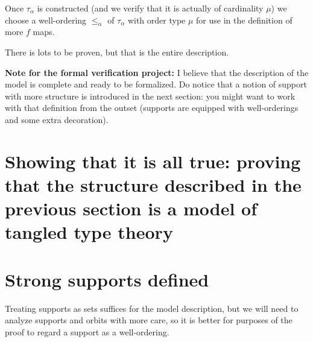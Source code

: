 Once $\tau_\alpha$ is constructed (and we verify that it is actually of cardinality $\mu$) we choose a well-ordering $\leq_\alpha$ of $\tau_\alpha$ with order type $\mu$ for use in the definition of more $f$ maps.

There is lots to be proven, but that is the entire description.


{\bf Note for the formal verification project:}  I believe that the description of the model is complete and ready to be formalized.  Do notice that a notion of support with more structure is introduced in the next section:  you might want to work with that definition from the outset (supports are equipped with well-orderings and some extra decoration).


\newpage

\section{Showing that it is all true:  proving that the structure described in the previous section is a model of tangled type theory}

\section{Strong supports defined}

Treating supports as sets suffices for the model description, but we will need to analyze supports and orbits with more care, so it is better for purposes
of the proof to regard a support as a well-ordering.

